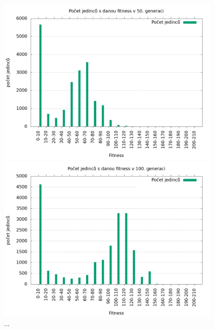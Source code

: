 \begin{figure}[h]
    \begin{minipage}[c]{0.48\linewidth}
        \includegraphics[width=\linewidth]{obrazky/trojnozka_primka_fitnessHistogram50.png}
        \caption{...}
    \end{minipage}
    \hfill
    \begin{minipage}[c]{0.48\linewidth}
        \includegraphics[width=\linewidth]{obrazky/trojnozka_primka_fitnessHistogram100.png}
        \caption{...}
    \end{minipage}
\end{figure}

